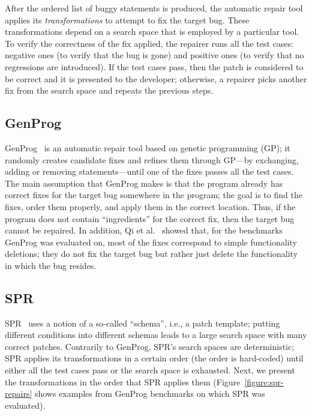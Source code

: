 After the ordered list of buggy statements is produced, the automatic repair tool applies its \emph{transformations} to attempt to fix the target bug. These transformations depend on a search space that is employed by a particular tool. To verify the correctness of the fix applied, the repairer runs all the test cases: negative ones (to verify that the bug is gone) and positive ones (to verify that no regressions are introduced). If the test cases pass, then the patch is considered to be correct and it is presented to the developer; otherwise, a repairer picks another fix from the search space and repeats the previous steps.

\subsection{GenProg}

GenProg~\cite{le2012systematic} is an automatic repair tool based on genetic programming (GP); it randomly creates candidate fixes and refines them through GP---by exchanging, adding or removing statements---until one of the fixes passes all the test cases. The main assumption that GenProg makes is that the program already has correct fixes for the target bug somewhere in the program; the goal is to find the fixes, order them properly, and apply them in the correct location. Thus, if the program does not contain ``ingredients'' for the correct fix, then the target bug cannot be repaired. In addition, Qi et al.~\cite{qi2015analysis} showed that, for the benchmarks GenProg was evaluated on, most of the fixes correspond to simple functionality deletions; they do not fix the target bug but rather just delete the functionality in which the bug resides.

\subsection{SPR} 

SPR~\cite{long2015staged} uses a notion of a so-called ``schema'', i.e., a patch template; putting different conditions into different schemas leads to a large search space with many correct patches. Contrarily to GenProg, SPR's search spaces are deterministic; SPR applies its transformations in a certain order (the order is hard-coded) until either all the test cases pass or the search space is exhausted. Next, we present the transformations in the order that SPR applies them (Figure~\ref{figure:spr-repairs} shows examples from GenProg benchmarks on which SPR was evaluated).

